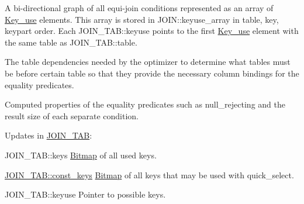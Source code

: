 \begin{DoxyItemize}
\item A bi-\/directional graph of all equi-\/join conditions represented as an array of \mbox{\hyperlink{classKey__use}{Key\+\_\+use}} elements. This array is stored in J\+O\+I\+N\+::keyuse\+\_\+array in table, key, keypart order. Each J\+O\+I\+N\+\_\+\+T\+A\+B\+::keyuse points to the first \mbox{\hyperlink{classKey__use}{Key\+\_\+use}} element with the same table as J\+O\+I\+N\+\_\+\+T\+A\+B\+::table.
\item The table dependencies needed by the optimizer to determine what tables must be before certain table so that they provide the necessary column bindings for the equality predicates.
\item Computed properties of the equality predicates such as null\+\_\+rejecting and the result size of each separate condition.
\end{DoxyItemize}

Updates in \mbox{\hyperlink{classJOIN__TAB}{J\+O\+I\+N\+\_\+\+T\+AB}}\+:
\begin{DoxyItemize}
\item J\+O\+I\+N\+\_\+\+T\+A\+B\+::keys \mbox{\hyperlink{classBitmap}{Bitmap}} of all used keys.
\item \mbox{\hyperlink{classJOIN__TAB_a338f4f13ed22b1d5bc4a1807f7e15705}{J\+O\+I\+N\+\_\+\+T\+A\+B\+::const\+\_\+keys}} \mbox{\hyperlink{classBitmap}{Bitmap}} of all keys that may be used with quick\+\_\+select.
\item J\+O\+I\+N\+\_\+\+T\+A\+B\+::keyuse Pointer to possible keys. 
\end{DoxyItemize}